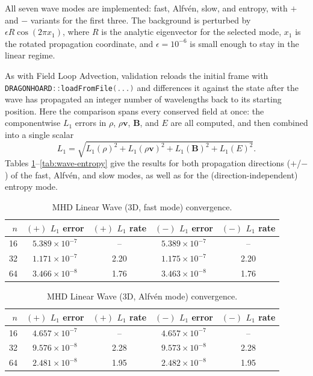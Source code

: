 \documentclass[11pt]{report}
\newcommand{\cpp}[1]{\lstinline[language=C++]{#1}}
\begin{document}
All seven wave modes are implemented: fast, Alfv\'en, slow, and entropy, with $+$ and $-$ variants for the first three.
 The background is perturbed by $\epsilon R\cos(2\pi x_1)$, where $R$ is the analytic eigenvector for the selected mode, $x_1$ is the rotated propagation coordinate, and $\epsilon=10^{-6}$ is small enough to stay in the linear regime.

As with Field Loop Advection, validation reloads the initial frame with \cpp{DRAGONHOARD::loadFromFile(...)} and differences it against the state after the wave has propagated an integer number of wavelengths back to its starting position. Here the comparison spans every conserved field at once: the componentwise $L_1$ errors in $\rho$, $\rho\mathbf{v}$, $\mathbf{B}$, and $E$ are all computed, and then combined into a single scalar
\begin{equation}
L_1 = \sqrt{L_1(\rho)^2 + L_1(\rho\mathbf{v})^2 + L_1(\mathbf B)^2 + L_1(E)^2}.
\end{equation}
Tables \ref{tab:wave-fast}--\ref{tab:wave-entropy} give the results for both propagation directions ($+$/$-$) of the fast, Alfv\'en, and slow modes, as well as for the (direction-independent) entropy mode.

\begin{table}[htbp]
\centering
\caption{MHD Linear Wave (3D, fast mode) convergence.}
\begin{tabular}{rcccc}
\toprule
$n$ & $(+)$ $L_1$ error & $(+)$ $L_1$ rate & $(-)$ $L_1$ error & $(-)$ $L_1$ rate \\
\midrule
16 & $5.389\times10^{-7}$ & --   & $5.389\times10^{-7}$ & --   \\
32 & $1.171\times10^{-7}$ & 2.20 & $1.175\times10^{-7}$ & 2.20 \\
64 & $3.466\times10^{-8}$ & 1.76 & $3.463\times10^{-8}$ & 1.76 \\
\bottomrule
\end{tabular}
\label{tab:wave-fast}
\end{table}

\begin{table}[htbp]
\centering
\caption{MHD Linear Wave (3D, Alfv\'en mode) convergence.}
\begin{tabular}{rcccc}
\toprule
$n$ & $(+)$ $L_1$ error & $(+)$ $L_1$ rate & $(-)$ $L_1$ error & $(-)$ $L_1$ rate \\
\midrule
16 & $4.657\times10^{-7}$ & --   & $4.657\times10^{-7}$ & --   \\
32 & $9.576\times10^{-8}$ & 2.28 & $9.573\times10^{-8}$ & 2.28 \\
64 & $2.481\times10^{-8}$ & 1.95 & $2.482\times10^{-8}$ & 1.95 \\
\bottomrule
\end{tabular}
\label{tab:wave-alfven}
\end{table}
\end{document}
